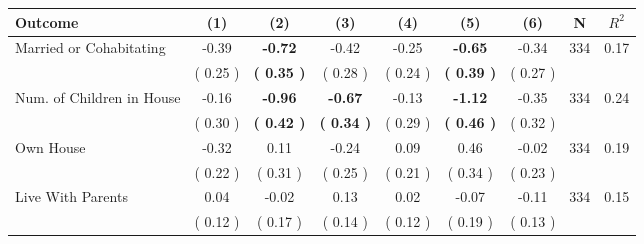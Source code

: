 \begin{tabular}{lcccccccc}
\toprule
 \textbf{Outcome} & \textbf{(1)} & \textbf{(2)} & \textbf{(3)} & \textbf{(4)} & \textbf{(5)} & \textbf{(6)} & \textbf{N} & \textbf{$ R^2$} \\
\midrule
Married or Cohabitating &     -0.39 & \textbf{    -0.72} &     -0.42 &     -0.25 & \textbf{    -0.65} &     -0.34 & 334 &       0.17 \\ 
 & (     0.25 ) & \textbf{(     0.35 )} & (     0.28 ) & (     0.24 ) & \textbf{(     0.39 )} & (     0.27 ) & \\
Num. of Children in House &     -0.16 & \textbf{    -0.96} & \textbf{    -0.67} &     -0.13 & \textbf{    -1.12} &     -0.35 & 334 &       0.24 \\ 
 & (     0.30 ) & \textbf{(     0.42 )} & \textbf{(     0.34 )} & (     0.29 ) & \textbf{(     0.46 )} & (     0.32 ) & \\
Own House &     -0.32 &      0.11 &     -0.24 &      0.09 &      0.46 &     -0.02 & 334 &       0.19 \\ 
 & (     0.22 ) & (     0.31 ) & (     0.25 ) & (     0.21 ) & (     0.34 ) & (     0.23 ) & \\
Live With Parents &      0.04 &     -0.02 &      0.13 &      0.02 &     -0.07 &     -0.11 & 334 &       0.15 \\ 
 & (     0.12 ) & (     0.17 ) & (     0.14 ) & (     0.12 ) & (     0.19 ) & (     0.13 ) & \\
\bottomrule
\end{tabular}
